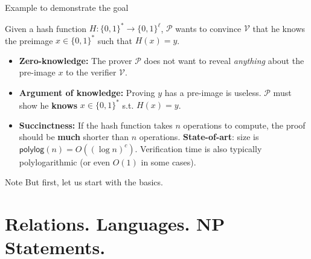 \documentclass{zkdl-presentation-template}
\begin{document}
    \begin{frame}{Example to demonstrate the goal}
        \begin{example}
            Given a hash function $H: \{0,1\}^* \to \{0,1\}^{\ell}$, $\mathcal{P}$ wants to convince $\mathcal{V}$ that he knows the preimage $x \in \{0,1\}^*$ such that $H(x) = y$.
            \begin{itemize}
                \item \textbf{Zero-knowledge:} The prover $\mathcal{P}$ does not want to reveal \textit{anything} about the pre-image $x$ to the verifier $\mathcal{V}$.
                \item \textbf{Argument of knowledge:} Proving $y$ has a pre-image is useless. $\mathcal{P}$ must show he \textbf{knows} $x \in \{0,1\}^*$ s.t. $H(x)=y$.
                \item \textbf{Succinctness:} If the hash function takes $n$ operations to compute, the proof should be \textbf{much} shorter than $n$ operations. \textbf{State-of-art}: size is $\mathsf{polylog}(n) = O((\log n)^c)$. Verification time is also typically polylogarithmic (or even $O(1)$ in some cases).
            \end{itemize}
        \end{example}

        \begin{block}{Note}
            But first, let us start with the basics.
        \end{block}
    \end{frame}

    \section{Relations. Languages. NP Statements.}
\end{document}

